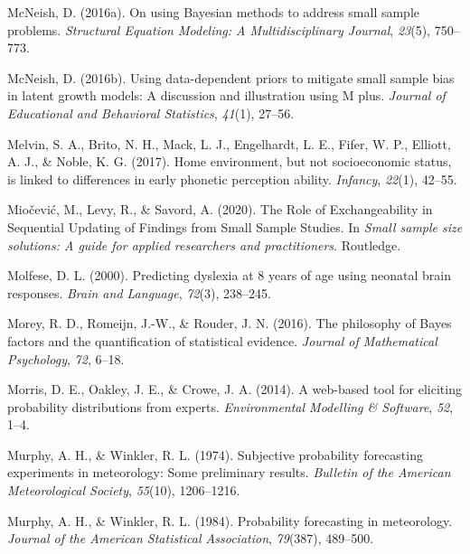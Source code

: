 \documentclass[openright,titlepage,12pt,a4paper]{book}
\begin{document}
\leavevmode\hypertarget{ref-mcneish_using_2016}{}%
McNeish, D. (2016a). On using Bayesian methods to address small sample problems. \emph{Structural Equation Modeling: A Multidisciplinary Journal}, \emph{23}(5), 750--773.

\leavevmode\hypertarget{ref-mcneish_using_2016-1}{}%
McNeish, D. (2016b). Using data-dependent priors to mitigate small sample bias in latent growth models: A discussion and illustration using M plus. \emph{Journal of Educational and Behavioral Statistics}, \emph{41}(1), 27--56.

\leavevmode\hypertarget{ref-melvin_home_2017}{}%
Melvin, S. A., Brito, N. H., Mack, L. J., Engelhardt, L. E., Fifer, W. P., Elliott, A. J., \& Noble, K. G. (2017). Home environment, but not socioeconomic status, is linked to differences in early phonetic perception ability. \emph{Infancy}, \emph{22}(1), 42--55.

\leavevmode\hypertarget{ref-miocevic_role_2020}{}%
Miočević, M., Levy, R., \& Savord, A. (2020). The Role of Exchangeability in Sequential Updating of Findings from Small Sample Studies. In \emph{Small sample size solutions: A guide for applied researchers and practitioners}. Routledge.

\leavevmode\hypertarget{ref-molfese_predicting_2000}{}%
Molfese, D. L. (2000). Predicting dyslexia at 8 years of age using neonatal brain responses. \emph{Brain and Language}, \emph{72}(3), 238--245.

\leavevmode\hypertarget{ref-morey_philosophy_2016}{}%
Morey, R. D., Romeijn, J.-W., \& Rouder, J. N. (2016). The philosophy of Bayes factors and the quantification of statistical evidence. \emph{Journal of Mathematical Psychology}, \emph{72}, 6--18.

\leavevmode\hypertarget{ref-morris_web-based_2014}{}%
Morris, D. E., Oakley, J. E., \& Crowe, J. A. (2014). A web-based tool for eliciting probability distributions from experts. \emph{Environmental Modelling \& Software}, \emph{52}, 1--4.

\leavevmode\hypertarget{ref-murphy_subjective_1974}{}%
Murphy, A. H., \& Winkler, R. L. (1974). Subjective probability forecasting experiments in meteorology: Some preliminary results. \emph{Bulletin of the American Meteorological Society}, \emph{55}(10), 1206--1216.

\leavevmode\hypertarget{ref-murphy_probability_1984}{}%
Murphy, A. H., \& Winkler, R. L. (1984). Probability forecasting in meteorology. \emph{Journal of the American Statistical Association}, \emph{79}(387), 489--500.
\end{document}

